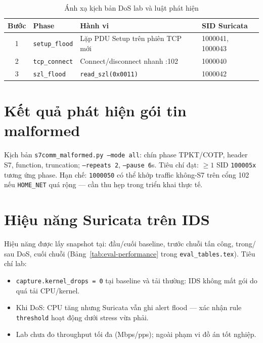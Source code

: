 \documentclass[../main.tex]{subfiles}
\begin{document}
\begin{table}[H]
    \centering
    \footnotesize
    \begin{tabular}{|c|l|l|l|}
        \hline
        \textbf{Bước} & \textbf{Phase} & \textbf{Hành vi} & \textbf{SID Suricata} \\
        \hline
        1 & \texttt{setup\_flood} & Lặp PDU Setup trên phiên TCP mới & 1000041, 1000043 \\
        \hline
        2 & \texttt{tcp\_connect} & Connect/disconnect nhanh :102 & 1000040 \\
        \hline
        3 & \texttt{szl\_flood} & \texttt{read\_szl(0x0011)} & 1000042 \\
        \hline
    \end{tabular}
    \caption{Ánh xạ kịch bản DoS lab và luật phát hiện}
    \label{tab:dos-eval}
\end{table}

\section{Kết quả phát hiện gói tin malformed}
\label{sec:eval-malformed}

Kịch bản \texttt{s7comm\_malformed.py --mode all}: chín phase TPKT/COTP, header S7, function, truncation; \texttt{--repeats 2}, \texttt{--pause 6}s. Tiêu chí đạt: $\geq 1$ SID \texttt{100005x} tương ứng phase. Hạn chế: \texttt{1000050} có thể khớp traffic không-S7 trên cổng 102 nếu \texttt{HOME\_NET} quá rộng --- cần thu hẹp trong triển khai thực tế.

\section{Hiệu năng Suricata trên IDS}
\label{sec:eval-performance}

Hiệu năng được lấy snapshot tại: đầu/cuối baseline, trước chuỗi tấn công, trong/ sau DoS, cuối chuỗi (Bảng~\ref{tab:eval-performance} trong \texttt{eval\_tables.tex}). Tiêu chí lab:
\begin{itemize}
    \item \texttt{capture.kernel\_drops = 0} tại baseline và tải thường: IDS không mất gói do quá tải CPU/kernel.
    \item Khi DoS: CPU tăng nhưng Suricata vẫn ghi alert flood --- xác nhận rule \texttt{threshold} hoạt động dưới stress vừa phải.
    \item Lab chưa đo throughput tối đa (Mbps/pps); ngoài phạm vi đồ án tốt nghiệp.
\end{itemize}
\end{document}
